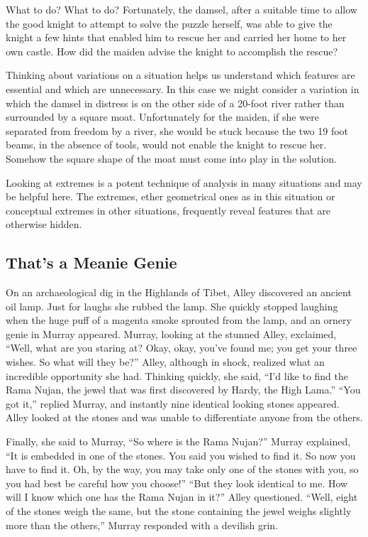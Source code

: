 What to do? What to do? Fortunately, the damsel, after a suitable time to allow the good knight to attempt to solve the puzzle herself, was able to give the knight a few hints that enabled him to rescue her and carried her home to her own castle. How did the maiden advise the knight to accomplish the rescue?

\ifnudges
\hrulefill

Thinking about variations on a situation helps us understand which features are essential and which are unnecessary.  In this case we might consider a variation in which the damsel in distress is on the other side of a 20-foot river rather than surrounded by a square moat.  Unfortunately for the maiden, if she were separated from freedom by a river, she would be stuck because the two 19 foot beams, in the absence of tools, would not enable the knight to rescue her.  Somehow the square shape of the moat must come into play in the solution.

Looking at extremes is a potent technique of analysis in many situations and may be helpful here.  The extremes, ether geometrical ones as in this situation or conceptual extremes in other situations, frequently reveal features that are otherwise hidden.
\fi

\clearpage
\subsection{That's a Meanie Genie}

On an archaeological dig in the Highlands of Tibet, Alley discovered an ancient oil lamp. Just for laughs she rubbed the lamp. She quickly stopped laughing when the huge puff of a magenta smoke sprouted from the lamp, and an ornery genie in Murray appeared. Murray, looking at the stunned Alley, exclaimed, ``Well, what are you staring at? Okay, okay, you've found me; you get your three wishes. So what will they be?'' Alley, although in shock, realized what an incredible opportunity she had. Thinking quickly, she said, ``I'd like to find the Rama Nujan, the jewel that was first discovered by Hardy, the High Lama.'' ``You got it,'' replied Murray, and instantly nine identical looking stones appeared. Alley looked at the stones and was unable to differentiate anyone from the others. 

Finally, she said to Murray, ``So where is the Rama Nujan?'' Murray explained, ``It is embedded in one of the stones. You said you wished to find it. So now you have to find it. Oh, by the way, you may take only one of the stones with you, so you had best be careful how you choose!'' ``But they look identical to me. How will I know which one has the Rama Nujan in it?'' Alley questioned. ``Well, eight of the stones weigh the same, but the stone containing the jewel weighs slightly more than the others,'' Murray responded with a devilish grin.

